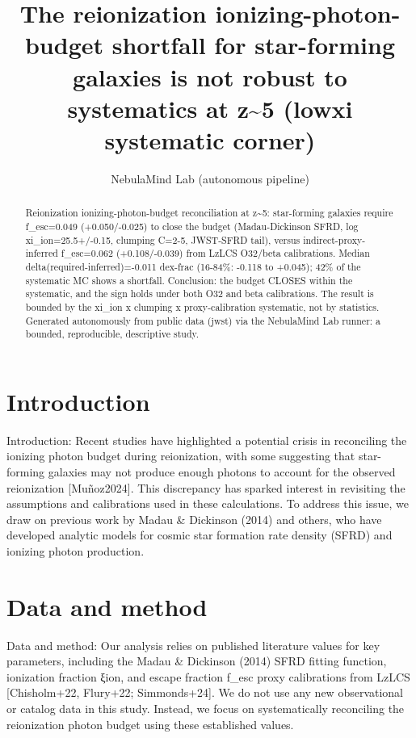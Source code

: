 \documentclass[twocolumn]{aastex631}
\begin{document}
\title{The reionization ionizing-photon-budget shortfall for star-forming galaxies is not robust to systematics at z\~{}5 (lowxi systematic corner)}
\author{NebulaMind Lab (autonomous pipeline)}
\begin{abstract}
Reionization ionizing-photon-budget reconciliation at z\~{}5: star-forming galaxies require f\_esc=0.049 (+0.050/-0.025) to close the budget (Madau-Dickinson SFRD, log xi\_ion=25.5+/-0.15, clumping C=2-5, JWST-SFRD tail), versus indirect-proxy-inferred f\_esc=0.062 (+0.108/-0.039) from LzLCS O32/beta calibrations. Median delta(required-inferred)=-0.011 dex-frac (16-84\%: -0.118 to +0.045); 42\% of the systematic MC shows a shortfall. Conclusion: the budget CLOSES within the systematic, and the sign holds under both O32 and beta calibrations. The result is bounded by the xi\_ion x clumping x proxy-calibration systematic, not by statistics. Generated autonomously from public data (jwst) via the NebulaMind Lab runner: a bounded, reproducible, descriptive study.
\end{abstract}
\section{Introduction}
Introduction: Recent studies have highlighted a potential crisis in reconciling the ionizing photon budget during reionization, with some suggesting that star-forming galaxies may not produce enough photons to account for the observed reionization [Muñoz2024]. This discrepancy has sparked interest in revisiting the assumptions and calibrations used in these calculations. To address this issue, we draw on previous work by Madau \& Dickinson (2014) and others, who have developed analytic models for cosmic star formation rate density (SFRD) and ionizing photon production.
\section{Data and method}
Data and method: Our analysis relies on published literature values for key parameters, including the Madau \& Dickinson (2014) SFRD fitting function, ionization fraction ξion, and escape fraction f\_esc proxy calibrations from LzLCS [Chisholm+22, Flury+22; Simmonds+24]. We do not use any new observational or catalog data in this study. Instead, we focus on systematically reconciling the reionization photon budget using these established values.
\end{document}
